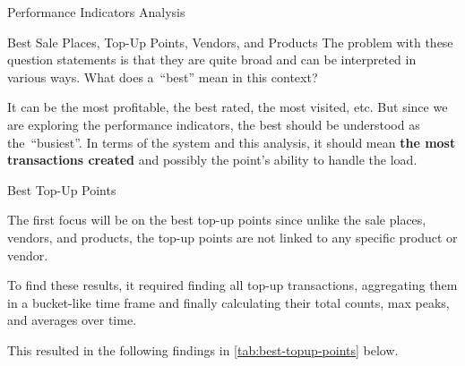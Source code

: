 \begin{section}{Performance Indicators Analysis}
\begin{subsection}{Best Sale Places, Top-Up Points, Vendors, and Products}
		The problem with these question statements is that they are quite broad and can be interpreted in various ways.
		What does a~\enquote{best} mean in this context?

		It can be the most profitable, the best rated, the most visited, etc.
		But since we are exploring the performance indicators, the best should be understood as the~\enquote{busiest}.
		In terms of the system and this analysis, it should mean \textbf{the most transactions created} and possibly the point's ability to handle the load.

		\begin{subsubsection}{Best Top-Up Points}
			\label{subsubsec:analysis-best-top-up-points}

			The first focus will be on the best top-up points since unlike the sale places, vendors, and products, the top-up points are not linked to any specific product or vendor.


			To find these results, it required finding all top-up transactions, aggregating them in a bucket-like time frame and finally calculating their total counts, max peaks, and averages over time.

			This resulted in the following findings in \autoref{tab:best-topup-points} below.


\end{subsubsection}
\end{subsection}
\end{section}
